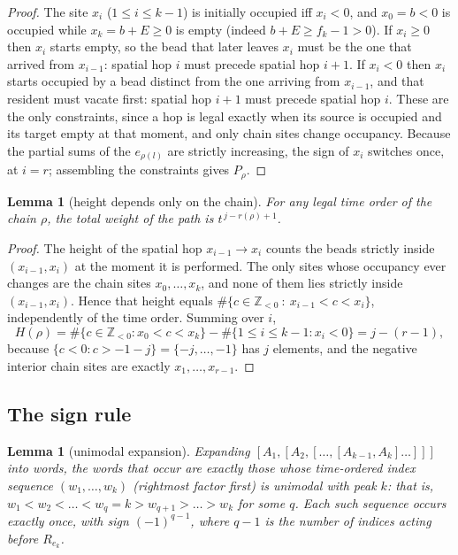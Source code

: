 \documentclass[11pt]{article}
\newtheorem{lemma}[theorem]{Lemma}
\theoremstyle{definition}
\newcommand{\Z}{\mathbb{Z}}
\begin{document}
\begin{proof}
The site $x_i$ ($1\le i\le k-1$) is initially occupied iff $x_i<0$, and $x_0=b<0$ is occupied
while $x_k=b+E\ge0$ is empty (indeed $b+E\ge f_k-1>0$). If $x_i\ge0$ then $x_i$ starts empty, so
the bead that later leaves $x_i$ must be the one that arrived from $x_{i-1}$: spatial hop $i$
must precede spatial hop $i+1$. If $x_i<0$ then $x_i$ starts occupied by a bead distinct from the
one arriving from $x_{i-1}$, and that resident must vacate first: spatial hop $i+1$ must precede
spatial hop $i$. These are the only constraints, since a hop is legal exactly when its source is
occupied and its target empty at that moment, and only chain sites change occupancy. Because the
partial sums of the $e_{\rho(l)}$ are strictly increasing, the sign of $x_i$ switches once, at
$i=r$; assembling the constraints gives $P_\rho$.
\end{proof}

\begin{lemma}[height depends only on the chain]\label{lem:height}
For any legal time order of the chain $\rho$, the total weight of the path is
$t^{\,j-r(\rho)+1}$.
\end{lemma}

\begin{proof}
The height of the spatial hop $x_{i-1}\to x_i$ counts the beads strictly inside $(x_{i-1},x_i)$ at
the moment it is performed. The only sites whose occupancy ever changes are the chain sites
$x_0,\dots,x_k$, and none of them lies strictly inside $(x_{i-1},x_i)$. Hence that height equals
$\#\{c\in\Z_{<0}\ :\ x_{i-1}<c<x_i\}$, independently of the time order. Summing over $i$,
\[
H(\rho)=\#\{c\in\Z_{<0}: x_0<c<x_k\}-\#\{1\le i\le k-1: x_i<0\}
= j-(r-1),
\]
because $\{c<0: c>-1-j\}=\{-j,\dots,-1\}$ has $j$ elements, and the negative interior chain sites
are exactly $x_1,\dots,x_{r-1}$.
\end{proof}

\subsection{The sign rule}

\begin{lemma}[unimodal expansion]\label{lem:sign}
Expanding $[A_1,[A_2,[\dots,[A_{k-1},A_k]\dots]]]$ into words, the words that occur are exactly
those whose \emph{time-ordered} index sequence $(w_1,\dots,w_k)$ (rightmost factor first) is
unimodal with peak $k$: that is, $w_1<w_2<\dots<w_q=k>w_{q+1}>\dots>w_k$ for some $q$. Each such
sequence occurs exactly once, with sign $(-1)^{q-1}$, where $q-1$ is the number of indices acting
before $R_{e_k}$.
\end{lemma}
\end{document}
